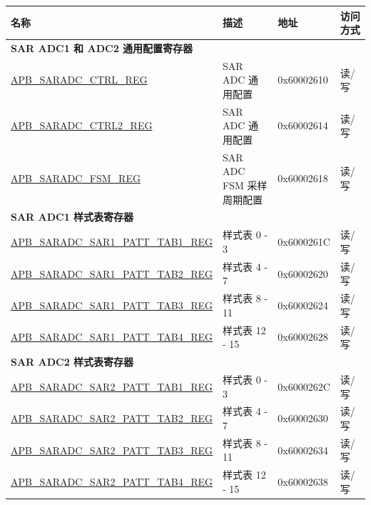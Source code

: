 
\begin{longtable}{ |p{6cm}|p{5cm}|p{2cm}|p{2cm}| }
\hline\rowcolor{lightgray}
名称 & 描述 &  地址 & 访问方式 \\ \hline
\multicolumn{4}{|l|}{\textbf{SAR ADC1 和 ADC2 通用配置寄存器}} \\ \hline
\hyperref[regdesc:APBSARADCCTRLREG]{APB\_SARADC\_CTRL\_REG} & SAR ADC 通用配置 & 0x60002610 & 读/写 \\ \hline 
\hyperref[regdesc:APBSARADCCTRL2REG]{APB\_SARADC\_CTRL2\_REG} & SAR ADC 通用配置 & 0x60002614 & 读/写 \\ \hline
\hyperref[regdesc:APBSARADCFSMREG]{APB\_SARADC\_FSM\_REG} & SAR ADC FSM 采样周期配置 & 0x60002618 & 读/写 \\ \hline
\multicolumn{4}{|l|}{\textbf{SAR ADC1 样式表寄存器}} \\ \hline
\hyperref[regdesc:APBSARADCSAR1PATTTAB1REG]{APB\_SARADC\_SAR1\_PATT\_TAB1\_REG} & 样式表 0 - 3  & 0x6000261C & 读/写 \\ \hline
\hyperref[regdesc:APBSARADCSAR1PATTTAB2REG]{APB\_SARADC\_SAR1\_PATT\_TAB2\_REG} & 样式表 4 - 7  & 0x60002620 & 读/写 \\ \hline
\hyperref[regdesc:APBSARADCSAR1PATTTAB3REG]{APB\_SARADC\_SAR1\_PATT\_TAB3\_REG} & 样式表 8 - 11  & 0x60002624 & 读/写 \\ \hline
\hyperref[regdesc:APBSARADCSAR1PATTTAB4REG]{APB\_SARADC\_SAR1\_PATT\_TAB4\_REG} & 样式表 12 - 15  & 0x60002628 & 读/写 \\ \hline
\multicolumn{4}{|l|}{\textbf{SAR ADC2 样式表寄存器}} \\ \hline
\hyperref[regdesc:APBSARADCSAR2PATTTAB1REG]{APB\_SARADC\_SAR2\_PATT\_TAB1\_REG} & 样式表 0 - 3  & 0x6000262C & 读/写 \\ \hline
\hyperref[regdesc:APBSARADCSAR2PATTTAB2REG]{APB\_SARADC\_SAR2\_PATT\_TAB2\_REG} & 样式表 4 - 7  & 0x60002630 & 读/写 \\ \hline
\hyperref[regdesc:APBSARADCSAR2PATTTAB3REG]{APB\_SARADC\_SAR2\_PATT\_TAB3\_REG} & 样式表 8 - 11  & 0x60002634 & 读/写 \\ \hline
\hyperref[regdesc:APBSARADCSAR2PATTTAB4REG]{APB\_SARADC\_SAR2\_PATT\_TAB4\_REG} & 样式表 12 - 15  & 0x60002638 & 读/写 \\ \hline
\end{longtable}
